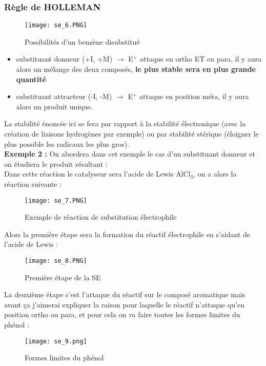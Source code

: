 \documentclass[a4paper, oneside]{book}
\begin{document}
\subsubsection{Règle de HOLLEMAN}
\begin{figure}[!h]
    \centering
    \texttt{[image: se\_6.PNG]}
    \caption{Possibilités d'un benzène disubstitué}
    \label{fig:my_label}
\end{figure}
\begin{itemize}
    \item substituant donneur (+I, +M) $\longrightarrow$ E$^+$ attaque en ortho ET en para, il y aura alors un mélange des deux composés, \textbf{le plus stable sera en plus grande quantité}
    \item substituant attracteur (-I, -M) $\longrightarrow$ E$^+$ attaque en position méta, il y aura alors un produit unique.
\end{itemize}
La stabilité énoncée ici se fera par rapport à la stabilité électronique (avec la création de liaisons hydrogènes par exemple) ou par stabilité stérique (éloigner le plus possible les radicaux les plus gros).\\
\textbf{Exemple 2 :} On abordera dans cet exemple le cas d'un substituant donneur et on étudiera le produit résultant :\\
Dans cette réaction le catalyseur sera l'acide de Lewis AlCl$_3$, on a alors la réaction suivante :
\begin{figure}[!h]
    \centering
    \texttt{[image: se\_7.PNG]}
    \caption{Exemple de réaction de substitution électrophile}
    \label{fig:my_label}
\end{figure}
\newpage
Alors la première étape sera la formation du réactif électrophile en s'aidant de l'acide de Lewis :
\begin{figure}[!h]
    \centering
    \texttt{[image: se\_8.PNG]}
    \caption{Première étape de la SE}
    \label{fig:my_label}
\end{figure}

La deuxième étape c'est l'attaque du réactif sur le composé aromatique mais avant ça j'aimerai expliquer la raison pour laquelle le réactif n'attaque qu'en position ortho ou para, et pour cela on va faire toutes les formes limites du phénol : 
\begin{figure}[!h]
    \centering
    \texttt{[image: se\_9.png]}
    \caption{Formes limites du phénol}
    \label{fig:my_label}
\end{figure}
\end{document}
